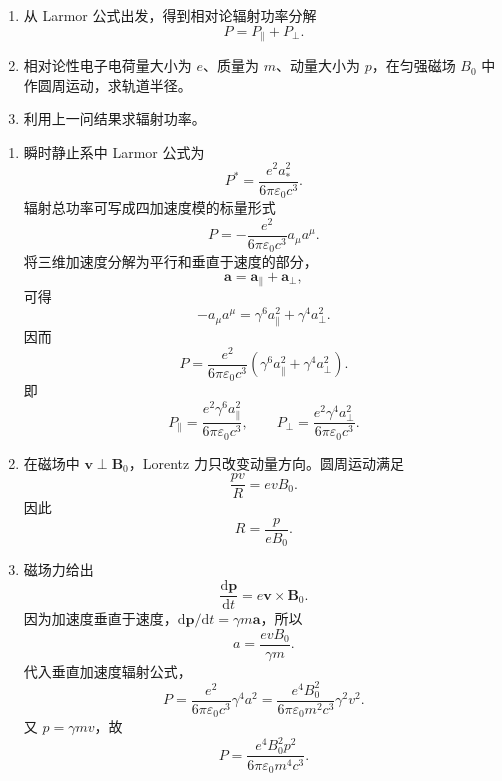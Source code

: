 \begin{question}[相对论辐射功率分解与磁场中圆周运动]
\begin{enumerate}
  \item 从 Larmor 公式出发，得到相对论辐射功率分解
  \[
    P=P_\parallel+P_\perp .
  \]
  \item 相对论性电子电荷量大小为 $e$、质量为 $m$、动量大小为 $p$，在匀强磁场 $B_0$ 中作圆周运动，求轨道半径。
  \item 利用上一问结果求辐射功率。
\end{enumerate}
\begin{solution}
\begin{enumerate}
  \item 瞬时静止系中 Larmor 公式为
  \[
    P^*=\frac{e^2a_*^2}{6\pi\varepsilon_0c^3} .
  \]
  辐射总功率可写成四加速度模的标量形式
  \[
    P=-\frac{e^2}{6\pi\varepsilon_0c^3}a_\mu a^\mu .
  \]
  将三维加速度分解为平行和垂直于速度的部分，
  \[
    \mathbf a=\mathbf a_\parallel+\mathbf a_\perp,
  \]
  可得
  \[
    -a_\mu a^\mu=\gamma^6a_\parallel^2+\gamma^4a_\perp^2 .
  \]
  因而
  \[
    \boxed{P=\frac{e^2}{6\pi\varepsilon_0c^3}
    \left(\gamma^6a_\parallel^2+\gamma^4a_\perp^2\right)} .
  \]
  即
  \[
    P_\parallel=\frac{e^2\gamma^6a_\parallel^2}{6\pi\varepsilon_0c^3},
    \qquad
    P_\perp=\frac{e^2\gamma^4a_\perp^2}{6\pi\varepsilon_0c^3} .
  \]

  \item 在磁场中 $\mathbf v\perp\mathbf B_0$，Lorentz 力只改变动量方向。圆周运动满足
  \[
    \frac{pv}{R}=evB_0 .
  \]
  因此
  \[
    \boxed{R=\frac{p}{eB_0}} .
  \]

  \item 磁场力给出
  \[
    \frac{\mathrm d\mathbf p}{\mathrm dt}=e\mathbf v\times\mathbf B_0 .
  \]
  因为加速度垂直于速度，$\mathrm d\mathbf p/\mathrm dt=\gamma m\mathbf a$，所以
  \[
    a=\frac{evB_0}{\gamma m} .
  \]
  代入垂直加速度辐射公式，
  \[
    P=\frac{e^2}{6\pi\varepsilon_0c^3}\gamma^4a^2
    =\frac{e^4B_0^2}{6\pi\varepsilon_0m^2c^3}\gamma^2v^2 .
  \]
  又 $p=\gamma mv$，故
  \[
    \boxed{P=\frac{e^4B_0^2p^2}{6\pi\varepsilon_0m^4c^3}} .
  \]
\end{enumerate}
\end{solution}
\end{question}

